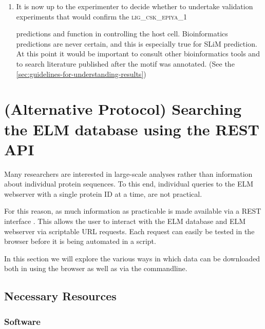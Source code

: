 \documentclass[12pt]{article}
\newcommand\motif[1]{%
    \textsc{\lowercase{#1}}%
}
\begin{document}
\begin{enumerate}
\item It is now up to the experimenter to decide whether to undertake
	validation experiments that would confirm the \motif{LIG\_CSK\_EPIYA\_1}
	predictions and function in controlling the host cell. Bioinformatics
	predictions are never certain, and this is especially true for SLiM
	prediction.  At this point it would be important to consult other
	bioinformatics tools and to search literature published after the motif
	was annotated.
	(See the \ref{sec:guidelines-for-understanding-results})

\end{enumerate}


%
%
\section{(Alternative Protocol) Searching the ELM database using the REST API}
\label{sec:search_REST}

Many researchers are interested in large-scale analyses rather than
information about individual protein sequences. To this end, individual
queries to the ELM webserver with a single protein ID at a time, are not
practical.

For this reason, as much information as practicable is made available via a
REST interface \citep{Fielding2002}. This allows the user to interact
with the ELM database and ELM webserver via scriptable URL requests.
Each request can easily be tested in the browser before it is being
automated in a script.

In this section we will explore the various ways in which data can be
downloaded both in using the browser as well as via the commandline.

%
%
\subsection*{Necessary Resources}
\subsubsection*{Software}

\end{document}
